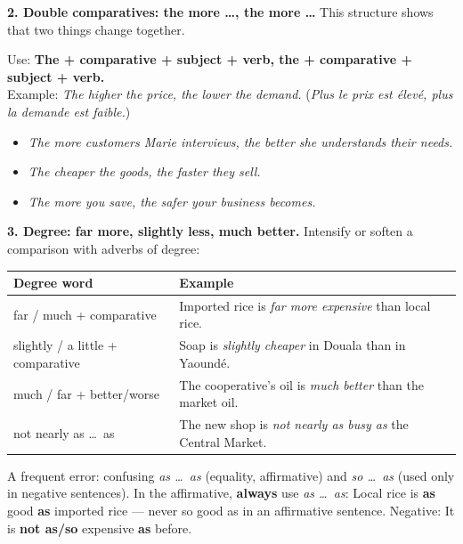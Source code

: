 \documentclass[11pt]{article}
\begin{document}
\textbf{2. Double comparatives: the more \ldots, the more \ldots} This structure shows that two things change together.

\begin{methode}
Use: \textbf{The + comparative + subject + verb, the + comparative + subject + verb.}\\
Example: \emph{The higher the price, the lower the demand.} (\emph{Plus le prix est élevé, plus la demande est faible.})
\end{methode}

\begin{exemplebox}
\begin{itemize}
\item \emph{The more customers Marie interviews, the better she understands their needs.}
\item \emph{The cheaper the goods, the faster they sell.}
\item \emph{The more you save, the safer your business becomes.}
\end{itemize}
\end{exemplebox}

\textbf{3. Degree: far more, slightly less, much better.} Intensify or soften a comparison with adverbs of degree:

\begin{center}
\begin{tabularx}{\linewidth}{|l|X|}
\hline
\rowcolor{popgreenL} \textbf{Degree word} & \textbf{Example} \\
\hline
far / much + comparative & Imported rice is \emph{far more expensive} than local rice. \\
\hline
slightly / a little + comparative & Soap is \emph{slightly cheaper} in Douala than in Yaoundé. \\
\hline
much / far + better/worse & The cooperative's oil is \emph{much better} than the market oil. \\
\hline
not nearly as \ldots\ as & The new shop is \emph{not nearly as busy as} the Central Market. \\
\hline
\end{tabularx}
\end{center}

\begin{attention}
A frequent error: confusing \emph{as \ldots\ as} (equality, affirmative) and \emph{so \ldots\ as} (used only in negative sentences). In the affirmative, \textbf{always} use \emph{as \ldots\ as}: \og Local rice is \textbf{as} good \textbf{as} imported rice \fg{} --- never \og so good as \fg{} in an affirmative sentence. Negative: \og It is \textbf{not as/so} expensive \textbf{as} before. \fg{}
\end{attention}
\end{document}
